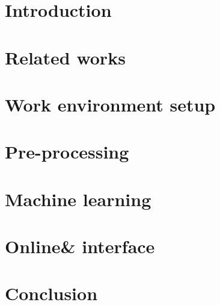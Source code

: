 


\setcounter{page}{1}
\setcounter{secnumdepth}{2}
\setcounter{tocdepth}{2}
\tableofcontents
\chapter{Introduction}

\chapter{Related works} \label{related_works}

\chapter{Work environment setup} \label{methods}




\chapter{Pre-processing} \label{preprocessing}


\chapter{Machine learning} \label{machine_learning}





%
\chapter{Online& interface}
 \label{online_tool}
\chapter{Conclusion}
 \label{conclusion}

\printbibliography